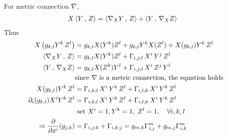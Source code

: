 \documentclass[11pt]{article}
\begin{document}
\begin{itemize}
For metric connection $\nabla$, 
\begin{align*}
X\left\langle Y\,,\, Z \right\rangle &= \left\langle \nabla_{X}{Y}\,,\, Z \right\rangle + \left\langle Y\,,\, \nabla_{X}{Z} \right\rangle
\end{align*}
Thus
\begin{align*}
X\left(g_{k,l}Y^k\,Z^{l}\right) &= g_{k,l}X(Y^k)Z^{l} + g_{k,l}Y^{k}X(Z^{l}) + X(g_{k,l})Y^k\,Z^{l}\\
\left\langle \nabla_{X}{Y}\,,\, Z \right\rangle &=g_{k,l}X(Y^k)Z^l + \Gamma_{i,j;l}\,X^i\,Y^j\,Z^l \\
\left\langle Y\,,\, \nabla_{X}{Z} \right\rangle &=g_{k,l}X(Z^k)Y^l + \Gamma_{i,j;l}\,X^i\,Z^j\,Y^l \\
&\text{since }\nabla\text{ is a metric connection, the equation holds} \\
X(g_{k,l})Y^k\,Z^{l} &= \Gamma_{i,k;l}\,X^i\,Y^k\,Z^l + \Gamma_{i,l;k}\,X^i\,Y^k \,Z^l \\
\partial_i(g_{k,l})X^i Y^k\,Z^{l} &= \Gamma_{i,k;l}\,X^i\,Y^k\,Z^l + \Gamma_{i,l;k}\,X^i\,Y^k \,Z^l \\
& \text{ set }X^i =1, Y^k = 1, \; Z^l = 1, \quad \forall i, k, l\\
\Rightarrow  \frac{\partial }{ \partial x^i}(g_{j,k})&=\Gamma_{i,j;k} + \Gamma_{i,k;j} = g_{m,k}\Gamma_{i,j}^{m} + g_{m,j}\Gamma_{i,k}^{m}
\end{align*}



\end{itemize}
\end{document}
